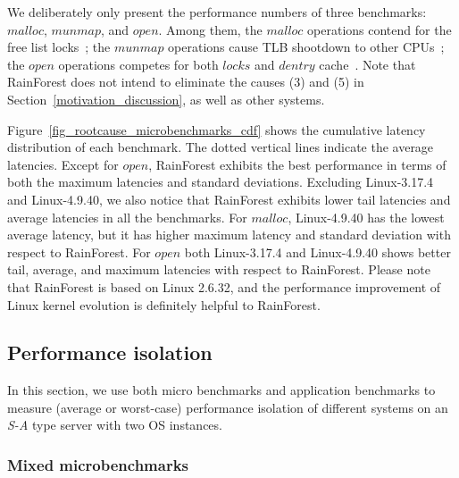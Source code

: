 \documentclass[pageno]{jpaper}
\begin{document}
 We deliberately  only present the performance numbers of three benchmarks:  $malloc$, $munmap$, and $open$. Among them, the $malloc$ operations contend for the free list locks~\cite{Michael:2004:SLD}; the $munmap$ operations cause TLB shootdown to other CPUs~\cite{DiDi2011}; the $open$ operations competes for both $locks$ and $dentry$ cache~\cite{Tsai:2015:GMV}. Note that RainForest does not intend to eliminate the causes (3) and (5)  in Section~\ref{motivation_discussion}, as well as other systems.


Figure~\ref{fig_rootcause_microbenchmarks_cdf} shows the cumulative latency distribution of each benchmark. The dotted vertical lines indicate the average latencies. Except for $open$, RainForest exhibits the best performance in terms of both the  maximum latencies and standard deviations.
Excluding Linux-3.17.4 and Linux-4.9.40, we also notice that RainForest exhibits lower tail latencies and average latencies in all the benchmarks.
For $malloc$, Linux-4.9.40 has the lowest average latency, but it has higher  maximum latency and standard deviation with respect to RainForest. For $open$ both Linux-3.17.4 and Linux-4.9.40 shows better tail, average, and maximum latencies with respect to RainForest.
Please note that RainForest is based on Linux 2.6.32, and the performance improvement of Linux kernel evolution is definitely helpful to RainForest.












\subsection{Performance isolation}
In this section, we use both micro benchmarks and application benchmarks to measure (average or worst-case) performance isolation of different systems on an \emph{S-A} type server with two OS instances.

\subsubsection{Mixed microbenchmarks}
\end{document}
